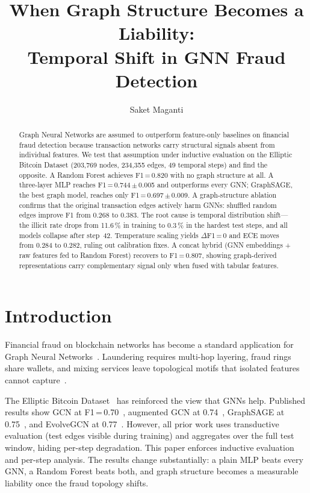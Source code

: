 \documentclass[runningheads]{llncs}
\title{When Graph Structure Becomes a Liability:\\
Temporal Shift in GNN Fraud Detection}
\author{Saket Maganti}
\institute{}
\begin{document}
\maketitle

\begin{abstract}
Graph Neural Networks are assumed to outperform feature-only baselines
on financial fraud detection because transaction networks carry
structural signals absent from individual features.  We test that
assumption under inductive evaluation on the Elliptic Bitcoin Dataset
(203,769 nodes, 234,355 edges, 49 temporal steps) and find the opposite.
A Random Forest achieves F1\,=\,0.820 with no graph structure at all.
A three-layer MLP reaches F1\,=\,0.744\,$\pm$\,0.005 and outperforms
every GNN; GraphSAGE, the best graph model, reaches only
F1\,=\,0.697\,$\pm$\,0.009.  A graph-structure ablation confirms that
the original transaction edges actively harm GNNs: shuffled random
edges improve F1 from 0.268 to 0.383.  The root cause is temporal
distribution shift---the illicit rate drops from 11.6\,\% in training
to 0.3\,\% in the hardest test steps, and all models collapse after
step~42.  Temperature scaling yields $\Delta$F1\,=\,0 and ECE moves
from 0.284 to 0.282, ruling out calibration fixes.  A concat hybrid
(GNN embeddings + raw features fed to Random Forest) recovers to
F1\,=\,0.807, showing graph-derived representations carry complementary
signal only when fused with tabular features.

\end{abstract}

\section{Introduction}

Financial fraud on blockchain networks has become a standard application
for Graph Neural Networks~\citep{akoglu2015graph,hilal2022fraud}.
Laundering requires multi-hop layering, fraud rings share wallets, and
mixing services leave topological motifs that isolated features cannot
capture~\citep{meiklejohn2013bitcoin}.

The Elliptic Bitcoin Dataset~\citep{weber2019} has reinforced the view
that GNNs help.  Published results show GCN at
F1\,=\,0.70~\citep{weber2019}, augmented GCN at
0.74~\citep{alarab2020}, GraphSAGE at 0.75~\citep{lo2023}, and
EvolveGCN at 0.77~\citep{pareja2020evolvegcn}.  However, all prior work
uses transductive evaluation (test edges visible during training) and
aggregates over the full test window, hiding per-step degradation.  This
paper enforces inductive evaluation and per-step analysis.  The results
change substantially: a plain MLP beats every GNN, a Random Forest beats
both, and graph structure becomes a measurable liability once the fraud
topology shifts.
\end{document}
